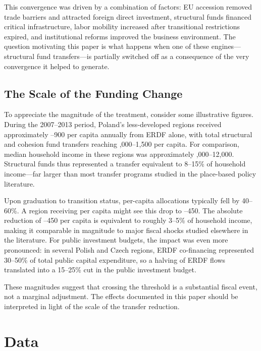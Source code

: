 \documentclass[12pt]{article}
\begin{document}
This convergence was driven by a combination of factors: EU accession removed trade barriers and attracted foreign direct investment, structural funds financed critical infrastructure, labor mobility increased after transitional restrictions expired, and institutional reforms improved the business environment. The question motivating this paper is what happens when one of these engines---structural fund transfers---is partially switched off as a consequence of the very convergence it helped to generate.

\subsection{The Scale of the Funding Change}

To appreciate the magnitude of the treatment, consider some illustrative figures. During the 2007--2013 period, Poland's less-developed regions received approximately --900 per capita annually from ERDF alone, with total structural and cohesion fund transfers reaching ,000--1,500 per capita. For comparison, median household income in these regions was approximately ,000--12,000. Structural funds thus represented a transfer equivalent to 8--15\% of household income---far larger than most transfer programs studied in the place-based policy literature.

Upon graduation to transition status, per-capita allocations typically fell by 40--60\%. A region receiving  per capita might see this drop to --450. The absolute reduction of --450 per capita is equivalent to roughly 3--5\% of household income, making it comparable in magnitude to major fiscal shocks studied elsewhere in the literature. For public investment budgets, the impact was even more pronounced: in several Polish and Czech regions, ERDF co-financing represented 30--50\% of total public capital expenditure, so a halving of ERDF flows translated into a 15--25\% cut in the public investment budget.

These magnitudes suggest that crossing the threshold is a substantial fiscal event, not a marginal adjustment. The effects documented in this paper should be interpreted in light of the scale of the transfer reduction.

\section{Data}
\label{sec:data}
\end{document}
